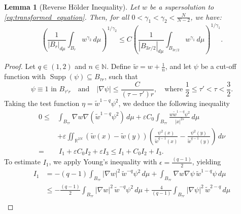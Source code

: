 \documentclass[11pt]{article}
\newtheorem{lemma}{Lemma}[section] %
\newcommand{\ntrl}{\mathbb{N}}
\begin{document}
\begin{lemma}[Reverse H\"{o}lder Inequality]
Let \( w \) be a supersolution to \eqref{eq:transformed_equation}. Then, for all \( 0 < \gamma_1 < \gamma_2 < \frac{N}{N - 2} \), we have:
\begin{equation} \label{lem:reverse_holder}
\left( \frac{1}{|B_r|_{d\mu}} \int_{B_r} w^{\gamma_2} \, d\mu \right)^{1/\gamma_2}
\leq C \left( \frac{1}{|B_{3r/2}|_{d\mu}} \int_{B_{3r/2}} w^{\gamma_1} \, d\mu \right)^{1/\gamma_1}.
\end{equation}
\end{lemma}
\begin{proof}
Let \( q \in (1,2) \) and \( n \in \ntrl\). Define \( \widetilde{w} = w + \frac{1}{n} \), and let \( \psi \) be a cut-off function with \( \operatorname{Supp}(\psi) \subseteq B_{\tau r} \), such that
\begin{equation*}
    \psi \equiv 1 \text{ in } B_{\tau' r} \quad \text{and} \quad |\nabla \psi| \leq \frac{C}{(\tau - \tau')r}, \quad \text{where } \frac{1}{2} \leq \tau' < \tau < \frac{3}{2}.
\end{equation*}
Taking the test function \( \eta = \widetilde{w}^{1-q} \psi^2 \), we deduce the following inequality
\begin{equation}\label{eq:rev_holder_eq1}
\begin{aligned}
0 \leq 
& \int_{B_{\tau r}} \nabla w  \nabla\left( \widetilde{w}^{1-q} \psi^2 \right) \, d\mu 
+ \varepsilon C_0 \int_{B_{\tau r}} \frac{w\widetilde{w}^{1-q} \psi^2}{|x|^{2s}} \, d\mu \\
&+ \varepsilon \iint_{\mathbb{R}^{2N}} \left( \widetilde{w}(x) - \widetilde{w}(y) \right) 
\left( \frac{\psi^2(x)}{\widetilde{w}^{q-1}(x)} - \frac{\psi^2(y)}{\widetilde{w}^{q-1}(y)} \right) \, d\nu\\
= &~ I_1 + \varepsilon C_0 I_2 + \varepsilon I_3 \leq I_1 + C_0 I_2 + I_3.
\end{aligned}
\end{equation}
To estimate \( I_1 \), we apply Young's inequality with \( \epsilon = \frac{(q - 1)}{2} \), yielding
\begin{equation}
\begin{aligned}
I_1 
&= - (q - 1) \int_{B_{\tau r}} |\nabla w|^2 \, \widetilde{w}^{-q} \psi^2 \, d\mu 
+ \int_{B_{\tau r}} \nabla w  \nabla \psi \, \widetilde{w}^{1-q} \psi \, d\mu \\
&\leq -\frac{(q - 1)}{2} \int_{B_{\tau r}} |\nabla w|^2 \, \widetilde{w}^{-q} \psi^2 \, d\mu 
+ \frac{4}{(q - 1)} \int_{B_{\tau r}} |\nabla \psi|^2 \, \widetilde{w}^{2 - q} \, d\mu \\

\end{aligned}
\end{equation}
\end{proof}
\end{document}
